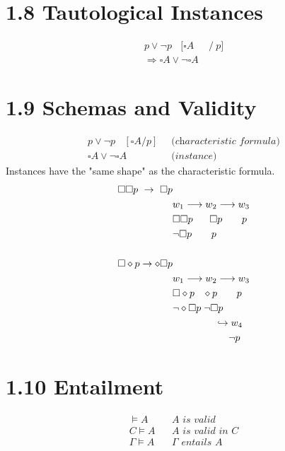 \documentclass{report}
\begin{document}
\section*{1.8 Tautological Instances}
\begin{align*}
	p \vee \neg p \ \ \ \ [\square A \ & / \ p] \\
	\Rightarrow \square A \vee \neg  \square A \ 
\end{align*}
\section*{1.9 Schemas and Validity}
\begin{align*}
	p \vee \neg p \ \ \ \ [\square A / p] \ & \textit{ (characteristic formula)} \\
	\square A \vee \neg  \square A \ & \textit{ (instance)} \ 
\end{align*}
Instances have the "same shape" as the characteristic formula.
\begin{align*}
	\square \square p \ \rightarrow \ \square p & \\
	& w_1 \longrightarrow w_2 \longrightarrow w_3 \\
	& \square \square p \hspace{0.6cm} \square p \hspace{0.7cm} p \\
	& \neg \square p \hspace{0.7cm} p\\
	\\
	\square \diamond p \rightarrow \diamond \square p & \\
	& w_1 \longrightarrow w_2 \longrightarrow w_3 \\
	& \square \diamond p \hspace{0.3cm} \diamond p \hspace{0.7cm} p \\
	& \neg \diamond \square p \hspace{0.1cm} \neg \square p \\
	& \hspace{1.5cm} \hookrightarrow w_4 \\
	& \hspace{2cm} \neg p
\end{align*}
\section*{1.10 Entailment}
\begin{align*}
	\models A \ \ \ \ & \textit{A is valid} \\
	C \models A \ \ \ \ & \textit{A is valid in C} \\
	\Gamma \models A \ \ \ \ & \Gamma \textit{ entails A}
\end{align*}
\end{document}
